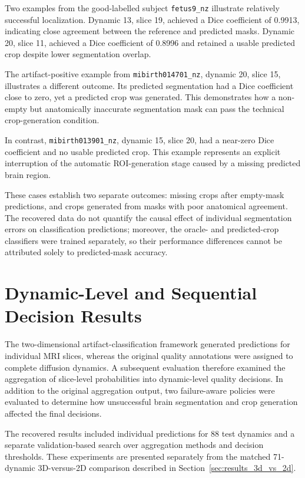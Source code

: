 Two examples from the good-labelled subject \texttt{fetus9\_nz} illustrate relatively successful localization. Dynamic 13, slice 19, achieved a Dice coefficient of 0.9913, indicating close agreement between the reference and predicted masks. Dynamic 20, slice 11, achieved a Dice coefficient of 0.8996 and retained a usable predicted crop despite lower segmentation overlap.

The artifact-positive example from \texttt{mibirth014701\_nz}, dynamic 20, slice 15, illustrates a different outcome. Its predicted segmentation had a Dice coefficient close to zero, yet a predicted crop was generated. This demonstrates how a non-empty but anatomically inaccurate segmentation mask can pass the technical crop-generation condition.

In contrast, \texttt{mibirth013901\_nz}, dynamic 15, slice 20, had a near-zero Dice coefficient and no usable predicted crop. This example represents an explicit interruption of the automatic ROI-generation stage caused by a missing predicted brain region.


These cases establish two separate outcomes: missing crops after empty-mask predictions, and crops generated from masks with poor anatomical agreement. The recovered data do not quantify the causal effect of individual segmentation errors on classification predictions; moreover, the oracle- and predicted-crop classifiers were trained separately, so their performance differences cannot be attributed solely to predicted-mask accuracy.

\section{Dynamic-Level and Sequential Decision Results}
\label{sec:results_dynamic_decisions}

The two-dimensional artifact-classification framework generated predictions for individual MRI slices, whereas the original quality annotations were assigned to complete diffusion dynamics. A subsequent evaluation therefore examined the aggregation of slice-level probabilities into dynamic-level quality decisions. In addition to the original aggregation output, two failure-aware policies were evaluated to determine how unsuccessful brain segmentation and crop generation affected the final decisions.

The recovered results included individual predictions for 88 test dynamics and a separate validation-based search over aggregation methods and decision thresholds. These experiments are presented separately from the matched 71-dynamic 3D-versus-2D comparison described in Section~\ref{sec:results_3d_vs_2d}.

